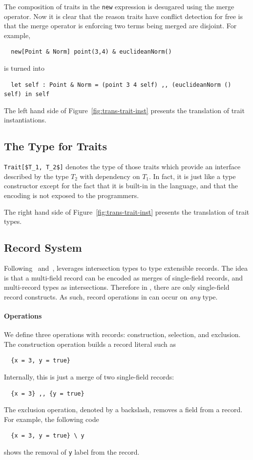 The composition of traits in the \lstinline{new} expression is desugared using
the merge operator. Now it is clear that the reason traits have conflict
detection for free is that the merge operator is enforcing two terms being
merged are disjoint. For example,
\begin{lstlisting}
  new[Point & Norm] point(3,4) & euclideanNorm()
\end{lstlisting}
is turned into
\begin{lstlisting}
  let self : Point & Norm = (point 3 4 self) ,, (euclideanNorm () self) in self
\end{lstlisting}

The left hand side of Figure~\ref{fig:trans-trait-inst} presents the translation
of trait instantiations.

\subsection{The Type for Traits}

\lstinline[mathescape=true]{Trait[$T_1, T_2$]} denotes the type of those traits
which provide an interface described by the type $T_2$ with dependency on $T_1$.
In fact, it is just like a type constructor except for the fact that it is
built-in in the language, and that the encoding is not exposed to the
programmers.

The right hand side of Figure~\ref{fig:trans-trait-inst} presents the
translation of trait types.

\subsection{Record System}

Following~\citet{reynolds1997design} and~\citet{castagna1995calculus}, \name
leverages intersection types to type extensible records. The idea is that a
multi-field record can be encoded as merges of single-field records, and
multi-record types as intersections. Therefore in \name, there are only
single-field record constructs. As such, record operations in \name can occur on
\textit{any} type.

\paragraph{Operations}
We define three operations with records: construction, selection, and exclusion.
The construction operation builds a record literal such as
\begin{lstlisting}
  {x = 3, y = true}
\end{lstlisting}
Internally, this is just a merge of two single-field records:
\begin{lstlisting}
  {x = 3} ,, {y = true}
\end{lstlisting}
The exclusion operation, denoted by a backslash, removes a field from a record.
For example, the following code
\begin{lstlisting}
  {x = 3, y = true} \ y
\end{lstlisting}
shows the removal of \lstinline{y} label from the record.

